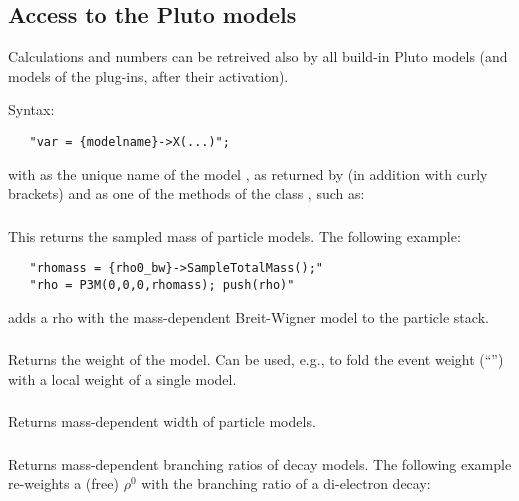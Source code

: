 {\subsection{Access to the Pluto models}

Calculations and numbers can be retreived also by all build-in Pluto
models (and models of the plug-ins, after their activation).

Syntax:

\begin{verbatim}
   "var = {modelname}->X(...)"; 
\end{verbatim}

with  as the unique name of the model , as returned by
 (in addition with
                                          curly brackets)
and  as one of the methods of the class ,
such as:

\subsubsection{} 

This returns the sampled mass of particle models. The following example:
\begin{verbatim}
   "rhomass = {rho0_bw}->SampleTotalMass();"
   "rho = P3M(0,0,0,rhomass); push(rho)"
\end{verbatim}
adds a rho with the mass-dependent Breit-Wigner model to the particle stack.

\subsubsection{} 

Returns the weight of the model. Can be used, e.g., to fold the event weight (``'')
with a local weight of a single model.

\subsubsection{} 

Returns mass-dependent width of particle models. 

\subsubsection{} 

Returns mass-dependent branching ratios of decay models. The following example re-weights a (free) $\rho^0$
with the branching ratio of a di-electron decay:

}
